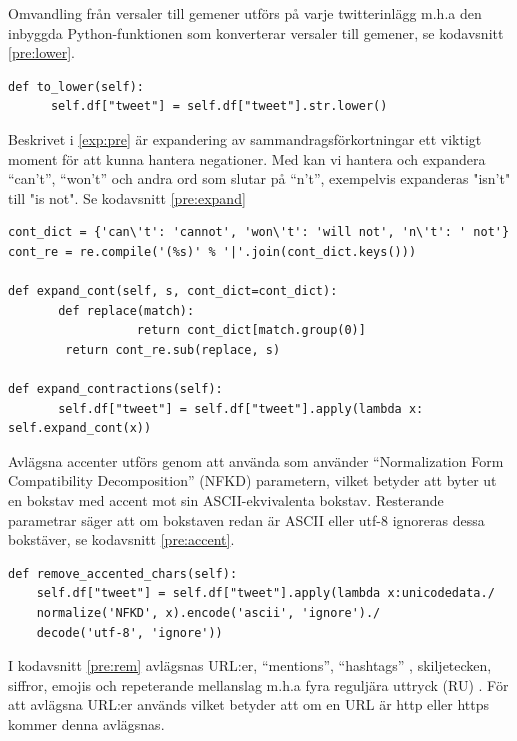 \documentclass{kaumasters} %
\begin{document}
Omvandling från versaler till gemener utförs på varje twitterinlägg m.h.a den inbyggda Python-funktionen  som konverterar versaler till gemener, se kodavsnitt \ref{pre:lower}.
\begin{lstlisting}[style=mypython,caption={Funktion för att omvandla versaler till gemener.},label=pre:lower]
def to_lower(self):
      self.df["tweet"] = self.df["tweet"].str.lower()
\end{lstlisting}

Beskrivet i \ref{exp:pre} är expandering av sammandragsförkortningar ett viktigt moment för att kunna hantera negationer. Med   kan vi hantera och expandera “can’t”, “won’t” och andra ord som slutar på “n’t”, exempelvis expanderas "isn't" till "is not". Se kodavsnitt \ref{pre:expand}
\begin{lstlisting}[style=mypython,caption={Kod för att expandera sammandragsförkortningar.},label=pre:expand]
cont_dict = {'can\'t': 'cannot', 'won\'t': 'will not', 'n\'t': ' not'}
cont_re = re.compile('(%s)' % '|'.join(cont_dict.keys()))

def expand_cont(self, s, cont_dict=cont_dict):
       def replace(match):
                  return cont_dict[match.group(0)]
        return cont_re.sub(replace, s)

def expand_contractions(self):
       self.df["tweet"] = self.df["tweet"].apply(lambda x: self.expand_cont(x))
\end{lstlisting}

Avlägsna accenter utförs genom att använda  \cite{impl:005} som använder “Normalization Form Compatibility Decomposition” (NFKD) parametern,  vilket betyder att  byter ut en bokstav med accent mot sin ASCII-ekvivalenta bokstav. Resterande parametrar säger att om bokstaven redan är ASCII eller utf-8 ignoreras dessa bokstäver, se kodavsnitt \ref{pre:accent}.
\begin{lstlisting}[style=mypython,caption={Funktion för att avlägsna accenter.},label=pre:accent]
def remove_accented_chars(self):
    self.df["tweet"] = self.df["tweet"].apply(lambda x:unicodedata./
    normalize('NFKD', x).encode('ascii', 'ignore')./
    decode('utf-8', 'ignore'))
\end{lstlisting}

I kodavsnitt \ref{pre:rem}  avlägsnas URL:er, “mentions”, “hashtags” , skiljetecken, siffror, emojis och repeterande mellanslag m.h.a fyra reguljära uttryck (RU) \cite{impl:003}. För att avlägsna URL:er används  vilket betyder att om en URL är http eller https kommer denna avlägsnas.
\end{document}
